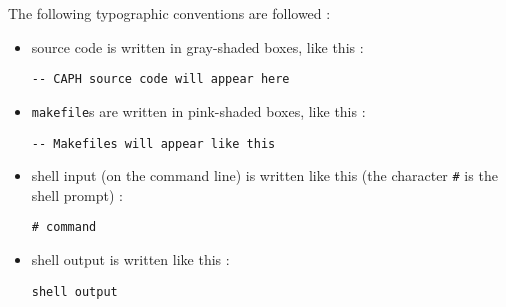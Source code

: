\bigskip
The following typographic conventions are followed :
\begin{itemize}
\item source code is written in gray-shaded boxes, like this :
\begin{lstlisting}[style=CaphStyle]
-- CAPH source code will appear here
\end{lstlisting}
\item \texttt{makefile}s are written in pink-shaded boxes, like this :
\begin{lstlisting}[style=MakeStyle]
-- Makefiles will appear like this
\end{lstlisting}
\item shell input (on the command line) is written like this (the character \verb|#| is the shell
  prompt) :
\begin{lstlisting}[style=BashInputStyle]
# command
\end{lstlisting}
\item shell output is written like this :
\begin{lstlisting}[style=BashOutputStyle]
shell output
\end{lstlisting}
\end{itemize}

